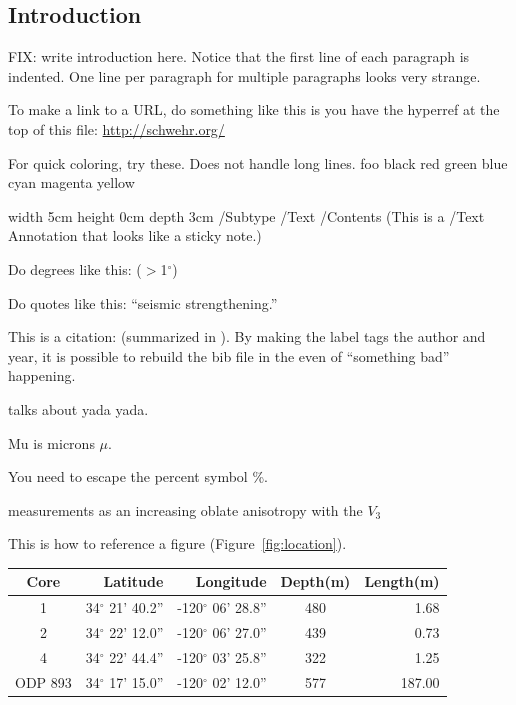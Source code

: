 \documentclass[agupp]{aguplus}
\begin{document}
\begin{article}

\section{Introduction}

FIX: write introduction here.  Notice that the first line of each
paragraph is indented.  One line per paragraph for multiple paragraphs
looks very strange.

To make a link to a URL, do something like this is you have the
hyperref at the top of this file:  \url{http://schwehr.org/}

For quick coloring, try these.  Does not handle long lines.
{\color{red}foo}  %
{\color{black}black}
{\color{red}red}
{\color{green}green}
{\color{blue}blue}
{\color{cyan}cyan}
{\color{magenta}magenta}
{\color{yellow}yellow}

\pdfannot width 5cm height 0cm depth 3cm 
{ 
/Subtype /Text /Contents 
(This is a /Text Annotation that looks like a sticky note.) 
} 

Do degrees like this: ($>$1$^{\circ}$)

Do quotes like this:  ``seismic strengthening.''

This is a citation: (summarized in \cite{tauxe1998}).  By making the
label tags the author and year, it is possible to rebuild the bib file
in the even of ``something bad'' happening.

\cite{tauxe1998} talks about yada yada.

Mu is microns $\mu$.

You need to escape the percent symbol \%.

measurements as an increasing oblate anisotropy with the $V_3$


This is how to reference a figure (Figure~\ref{fig:location}).

\begin{table}[htb]
\centering
\begin{tabular}{|c||r|r|c|r|}
\hline

Core & Latitude & Longitude & Depth(m) & Length(m)\\ \hline\hline
 1       & 34$^{\circ}$ 21' 40.2'' & -120$^{\circ}$ 06' 28.8'' & 480 & 1.68\\
 2       & 34$^{\circ}$ 22' 12.0'' & -120$^{\circ}$ 06' 27.0'' & 439 & 0.73\\
 4       & 34$^{\circ}$ 22' 44.4'' & -120$^{\circ}$ 03' 25.8'' & 322 & 1.25\\
 ODP 893 & 34$^{\circ}$ 17' 15.0'' & -120$^{\circ}$ 02' 12.0'' & 577 & 187.00 \\
\hline
\end{tabular}


\end{table}
\end{article}
\end{document}
